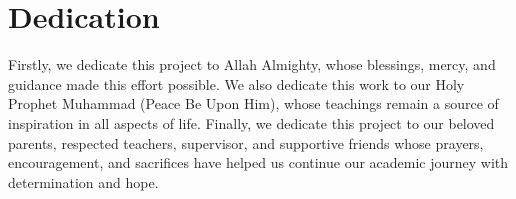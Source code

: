 \newpage
\thispagestyle{empty}
\chapter*{\centering Dedication}
\par\bigskip
Firstly, we dedicate this project to Allah Almighty, whose blessings, mercy, and guidance made this effort possible. We also dedicate this work to our Holy Prophet Muhammad (Peace Be Upon Him), whose teachings remain a source of inspiration in all aspects of life. Finally, we dedicate this project to our beloved parents, respected teachers, supervisor, and supportive friends whose prayers, encouragement, and sacrifices have helped us continue our academic journey with determination and hope.
